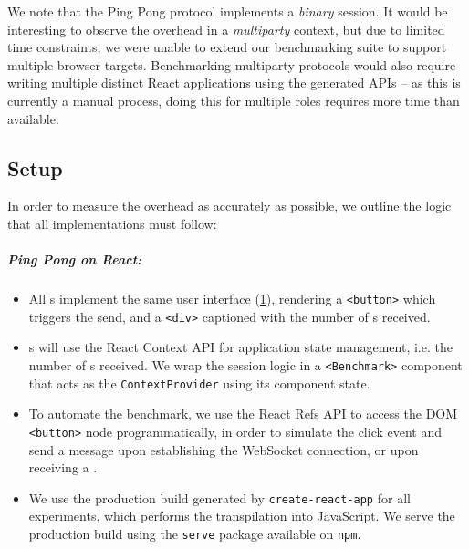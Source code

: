 We note that the Ping Pong protocol implements a \textit{binary} session. 
It would be interesting to observe the overhead in a \textit{multiparty}
context, but due to limited time constraints, we were unable to 
extend our benchmarking suite to support multiple browser targets.
Benchmarking multiparty protocols would also require writing multiple
distinct React applications using the generated APIs -- as this is currently
a manual process, doing this for multiple roles requires more time than
available.

\subsection{Setup}

In order to measure the overhead as accurately as possible,
we outline the logic that all implementations must follow:

\subparagraph{Ping Pong  on React:}
\begin{itemize}

\item All s implement the same user interface 
(\cref{fig:pingpongclient}), rendering
a \texttt{<button>} which triggers the send, and
a \texttt{<div>} captioned with the number of s received.

\item {}s will use the React Context API \cite{reactcontext}
for application state management, i.e. the number of s received. 
We wrap the session logic in a \texttt{<Benchmark>} component 
that acts as the \texttt{ContextProvider} using its component state.

\item To automate the benchmark, we use the React Refs API \cite{reactrefs}
to access the DOM \texttt{<button>} node programmatically, in order to
simulate the click event and send a  message upon establishing
the WebSocket connection, or upon receiving a .

\item We use the production build generated by 
\texttt{create-react-app} \cite{cra} for all experiments, which performs the
transpilation into JavaScript. We serve the production build using the
\texttt{serve} package \cite{npmserve} available on \texttt{npm}.

\end{itemize}

\begin{figure}[!ht]
\label{fig:pingpongclient}
\end{figure}

